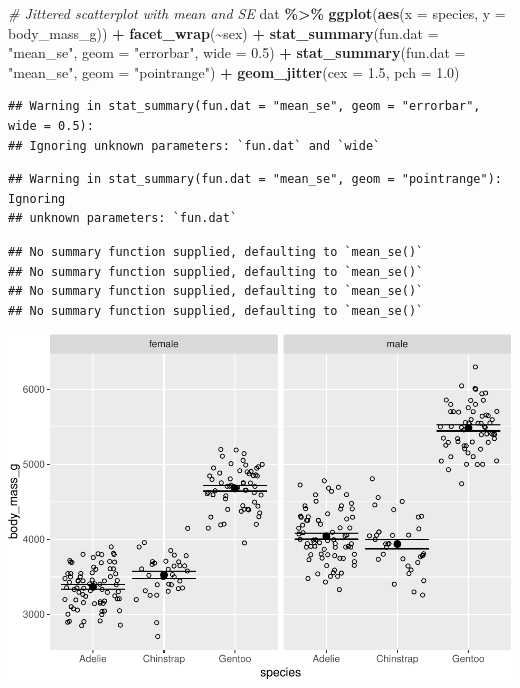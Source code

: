 \documentclass[
]{book}
\newenvironment{Shaded}{\begin{snugshade}}{\end{snugshade}}
\newcommand{\AttributeTok}[1]{\textcolor[rgb]{0.13,0.29,0.53}{#1}}
\newcommand{\CommentTok}[1]{\textcolor[rgb]{0.56,0.35,0.01}{\textit{#1}}}
\newcommand{\FloatTok}[1]{\textcolor[rgb]{0.00,0.00,0.81}{#1}}
\newcommand{\FunctionTok}[1]{\textcolor[rgb]{0.13,0.29,0.53}{\textbf{#1}}}
\newcommand{\NormalTok}[1]{#1}
\newcommand{\SpecialCharTok}[1]{\textcolor[rgb]{0.81,0.36,0.00}{\textbf{#1}}}
\newcommand{\StringTok}[1]{\textcolor[rgb]{0.31,0.60,0.02}{#1}}
\begin{document}
\begin{Shaded}
\begin{Highlighting}[]
\CommentTok{\# Jittered scatterplot with mean and SE}
\NormalTok{dat }\SpecialCharTok{\%\textgreater{}\%}
  \FunctionTok{ggplot}\NormalTok{(}\FunctionTok{aes}\NormalTok{(}\AttributeTok{x =}\NormalTok{ species, }\AttributeTok{y =}\NormalTok{ body\_mass\_g)) }\SpecialCharTok{+}
  \FunctionTok{facet\_wrap}\NormalTok{(}\SpecialCharTok{\textasciitilde{}}\NormalTok{sex) }\SpecialCharTok{+}
  \FunctionTok{stat\_summary}\NormalTok{(}\AttributeTok{fun.dat =} \StringTok{"mean\_se"}\NormalTok{, }\AttributeTok{geom =} \StringTok{"errorbar"}\NormalTok{, }\AttributeTok{wide =} \FloatTok{0.5}\NormalTok{) }\SpecialCharTok{+}
  \FunctionTok{stat\_summary}\NormalTok{(}\AttributeTok{fun.dat =} \StringTok{"mean\_se"}\NormalTok{, }\AttributeTok{geom =} \StringTok{"pointrange"}\NormalTok{) }\SpecialCharTok{+}
  \FunctionTok{geom\_jitter}\NormalTok{(}\AttributeTok{cex =} \FloatTok{1.5}\NormalTok{, }\AttributeTok{pch =} \FloatTok{1.0}\NormalTok{)}
\end{Highlighting}
\end{Shaded}

\begin{verbatim}
## Warning in stat_summary(fun.dat = "mean_se", geom = "errorbar", wide = 0.5):
## Ignoring unknown parameters: `fun.dat` and `wide`
\end{verbatim}

\begin{verbatim}
## Warning in stat_summary(fun.dat = "mean_se", geom = "pointrange"): Ignoring
## unknown parameters: `fun.dat`
\end{verbatim}

\begin{verbatim}
## No summary function supplied, defaulting to `mean_se()`
## No summary function supplied, defaulting to `mean_se()`
## No summary function supplied, defaulting to `mean_se()`
## No summary function supplied, defaulting to `mean_se()`
\end{verbatim}

\includegraphics{PSY202A-Modeling-I.Heo_files/figure-latex/unnamed-chunk-107-1.pdf}
\end{document}
